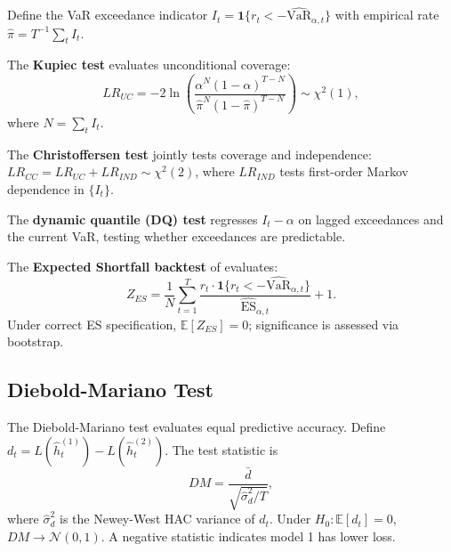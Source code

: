 Define the VaR exceedance indicator $I_t = \mathbf{1}\{r_t < -\widehat{\mathrm{VaR}}_{\alpha,t}\}$
with empirical rate $\hat{\pi} = T^{-1}\sum_t I_t$.

The \textbf{Kupiec test} \citep{Kupiec1995} evaluates unconditional coverage:
\[
    LR_{UC} = -2\ln\!\left(\frac{\alpha^N(1-\alpha)^{T-N}}{\hat{\pi}^N(1-\hat{\pi})^{T-N}}\right)
    \sim \chi^2(1),
\]
where $N = \sum_t I_t$.

The \textbf{Christoffersen test} \citep{Christoffersen1998} jointly tests coverage and
independence: $LR_{CC} = LR_{UC} + LR_{IND} \sim \chi^2(2)$, where $LR_{IND}$ tests
first-order Markov dependence in $\{I_t\}$.

The \textbf{dynamic quantile (DQ) test} \citep{engle2004caviar} regresses $I_t - \alpha$
on lagged exceedances and the current VaR, testing whether exceedances are predictable.

The \textbf{Expected Shortfall backtest} of \citet{acerbi2014backtesting} evaluates:
\[
    Z_{ES} = \frac{1}{N}\sum_{t=1}^T \frac{r_t \cdot \mathbf{1}\{r_t < -\widehat{\mathrm{VaR}}_{\alpha,t}\}}{\widehat{\mathrm{ES}}_{\alpha,t}} + 1.
\]
Under correct ES specification, $\mathbb{E}[Z_{ES}] = 0$; significance is assessed via bootstrap.

\subsection{Diebold-Mariano Test}

The Diebold-Mariano test \citep{DieboldMariano1995} evaluates equal predictive accuracy. Define
$d_t = L(\hat{h}^{(1)}_t) - L(\hat{h}^{(2)}_t)$. The test statistic is
\[
    DM = \frac{\bar{d}}{\sqrt{\hat{\sigma}^2_d / T}},
\]
where $\hat{\sigma}^2_d$ is the Newey-West HAC variance of $d_t$. Under $H_0: \mathbb{E}[d_t] = 0$,
$DM \to \mathcal{N}(0,1)$. A negative statistic indicates model 1 has lower loss.